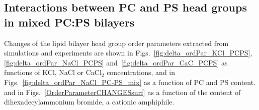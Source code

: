 \documentclass[journal=jpcbfk,manuscript=article]{achemso}
\begin{document}
 
 
 
\subsection{Interactions between PC and PS head groups in mixed PC:PS bilayers}


Changes of the lipid bilayer head group order parameters extracted from simulations and 
experiments \cite{roux90} are shown in Figs.~\ref{fig:delta_ordPar_KCl_PCPS}, \ref{fig:delta_ordPar_NaCl_PCPS} 
and~\ref{fig:delta_ordPar_CaC_PCPS} as functions of KCl, NaCl or CaCl$_2$ concentrations,
and in Figs.~\ref{fig:delta_ordPar_NaCl_PC-PS_mix} as a function of PC and PS content. 
and in Figs.~\ref{OrderParameterCHANGESsurf} as a function of the content of dihexadecylammonium bromide, a cationic amphiphile. 
\end{document}
